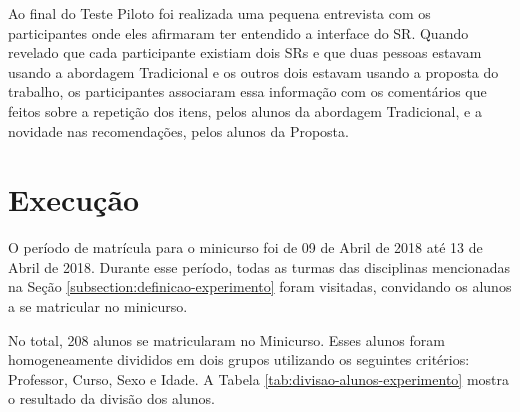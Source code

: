 Ao final do Teste Piloto foi realizada uma pequena entrevista com os participantes onde eles afirmaram ter entendido
a interface do SR. Quando revelado que cada participante existiam dois SRs e que duas pessoas estavam usando a abordagem
Tradicional e os outros dois estavam usando a proposta do trabalho, os participantes associaram essa informação com os
comentários que feitos sobre a repetição dos itens, pelos alunos da abordagem Tradicional, e a novidade nas recomendações,
pelos alunos da Proposta.

\section{Execução}\label{section:execucao-experimento}

O período de matrícula para o minicurso foi de 09 de Abril de 2018 até 13 de Abril de 2018. Durante esse período, todas as turmas
das disciplinas mencionadas na Seção \ref{subsection:definicao-experimento} foram visitadas, convidando os alunos a se matricular no minicurso.

No total, 208 alunos se matricularam no Minicurso. Esses alunos foram homogeneamente divididos em dois grupos utilizando os
seguintes critérios: Professor, Curso, Sexo e Idade. A Tabela \ref{tab:divisao-alunos-experimento} mostra o resultado da divisão dos alunos.

